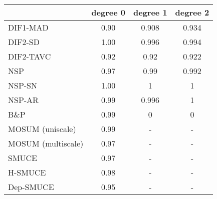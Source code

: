 \begin{tabular}{|l|c|c|c|}
  \hline
 & degree 0 & degree 1 & degree 2 \\ 
  \hline
DIF1-MAD & 0.90 & 0.908 & 0.934 \\ 
  DIF2-SD & 1.00 & 0.996 & 0.994 \\ 
  DIF2-TAVC & 0.92 & 0.92 & 0.922 \\ 
  NSP & 0.97 & 0.99 & 0.992 \\ 
  NSP-SN & 1.00 & 1 & 1 \\ 
  NSP-AR & 0.99 & 0.996 & 1 \\ 
  B\&P & 0.99 & 0 & 0 \\ 
  MOSUM (uniscale) & 0.99 & - & - \\ 
  MOSUM (multiscale) & 0.97 & - & - \\ 
  SMUCE & 0.97 & - & - \\ 
  H-SMUCE & 0.98 & - & - \\ 
  Dep-SMUCE & 0.95 & - & - \\ 
   \hline
\end{tabular}
